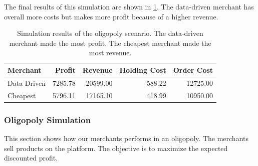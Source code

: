 The final results of this simulation are shown in \cref{tab:duopoly_cheapest}.
The data-driven merchant has overall more costs but makes more profit because of a higher revenue.

\begin{table}[t]
	\centering
	\begin{tabular}{lrrrr}
		\toprule
		Merchant & Profit & Revenue & Holding Cost & Order Cost \\
		\midrule
		Data-Driven & 7285.78 & 20599.00 & 588.22 & 12725.00 \\
		Cheapest & 5796.11 & 17165.10 & 418.99 & 10950.00 \\
		\bottomrule
	\end{tabular}
	\caption{Simulation results of the oligopoly scenario. The data-driven merchant made the most profit. The cheapest merchant made the most revenue.}
	\label{tab:duopoly_cheapest}
\end{table}


\subsubsection{Oligopoly Simulation}
This section shows how our merchants performs in an oligopoly.
The merchants sell products on the \pricewars platform.
The objective is to maximize the expected discounted profit.

